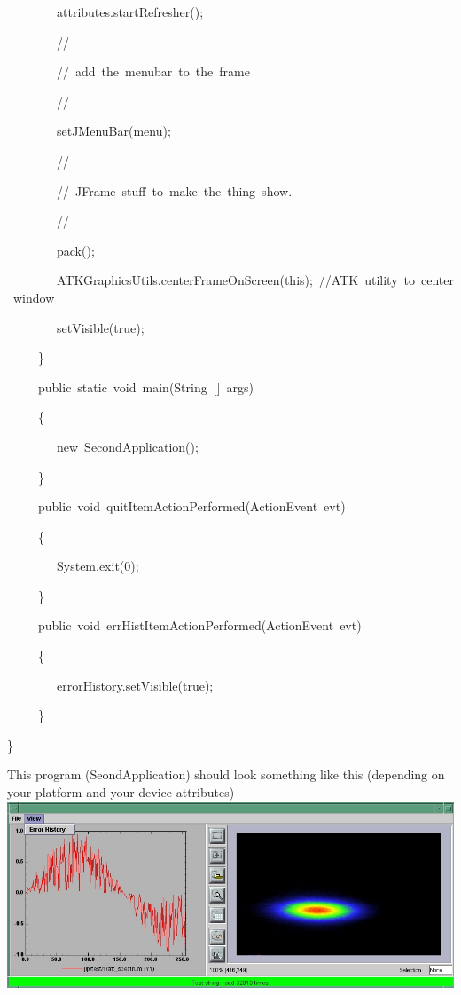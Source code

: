 \begin{lyxcode}
~~~~~~~~attributes.startRefresher();

~~~~~~~~//

~~~~~~~~//~add~the~menubar~to~the~frame

~~~~~~~~//

~~~~~~~~setJMenuBar(menu);

~~~~~~~~//

~~~~~~~~//~JFrame~stuff~to~make~the~thing~show.

~~~~~~~~//

~~~~~~~~pack();

~~~~~~~~ATKGraphicsUtils.centerFrameOnScreen(this);~//ATK~utility~to~center~window

~~~~~~~~setVisible(true);

~~~~~\}

~~~~~public~static~void~main(String~{[}{]}~args)

~~~~~\{

~~~~~~~~new~SecondApplication();

~~~~~\}

~~~~~public~void~quitItemActionPerformed(ActionEvent~evt)

~~~~~\{

~~~~~~~~System.exit(0);

~~~~~\}

~~~~~public~void~errHistItemActionPerformed(ActionEvent~evt)

~~~~~\{

~~~~~~~~errorHistory.setVisible(true);

~~~~~\}

\}

\end{lyxcode}


This program (SeondApplication) should look something like this (depending
on your platform and your device attributes)\\

\includegraphics[scale=0.5]{atk/img/prog_guide_exple2}
\begin{lyxcode}
\end{lyxcode}

